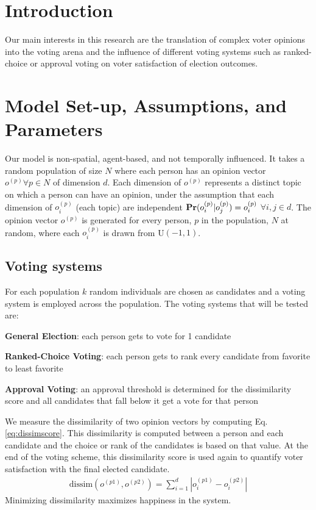 \section{Introduction}
\label{sec:intro}
Our main interests in this research are the translation of complex voter opinions into the voting arena and the influence of different voting systems such as ranked-choice or approval voting on voter satisfaction of election outcomes.



\section{Model Set-up, Assumptions, and Parameters}
\label{sec:model_setup}
Our model is non-spatial, agent-based, and not temporally influenced.
It takes a random population of size $N$ where each person has an opinion vector $o^{(p)} \forall p \in N$ of dimension $d$.
Each dimension of $o^{(p)}$ represents a distinct topic on which a person can have an opinion, under the assumption that each dimension of $o^{(p)}_i$ (each topic) are independent $\text{\bf Pr}(o^{(p)}_i | o^{(p)}_j) = o^{(p)}_i $  $\forall i,j \in d$.
The opinion vector $o^{(p)}$ is generated for every person, $p$ in the population, $N$ at random, where each $o^{(p)}_i$ is drawn from U$(-1,1)$.

\subsection{Voting systems}
For each population $k$ random individuals are chosen as candidates and a voting system is employed across the population.
The voting systems that will be tested are:
\begin{enum_tight}
\item {\bf General Election}: each person gets to vote for 1 candidate
\item {\bf Ranked-Choice Voting}: each person gets to rank every candidate from favorite to least favorite
\item {\bf Approval Voting}: an approval threshold is determined for the dissimilarity score and all candidates that fall below it get a vote for that person
\end{enum_tight}
We measure the dissimilarity of two opinion vectors by computing Eq. \ref{eq:dissimscore}.
This dissimilarity is computed between a person and each candidate and the choice or rank of the candidates is based on that value.
At the end of the voting scheme, this dissimilarity score is used again to quantify voter satisfaction with the final elected candidate.
\begin{align}
    \text{dissim}(o^{(p1)},o^{(p2)}) = \sum_{i=1}^{d}|o^{(p1)}_i - o^{(p2)}_i|
    \label{eq:dissimscore}
\end{align}
Minimizing dissimilarity maximizes happiness in the system.

